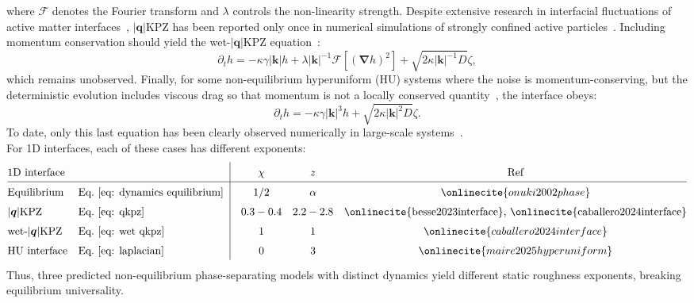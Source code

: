 \documentclass[aps,
reprint,
superscriptaddress,









amsmath,amssymb,floatfix,






prl
]{revtex4-2}
\begin{document}
where $\mathcal F$ denotes the Fourier transform and $\lambda$ controls the non-linearity strength. Despite extensive research in interfacial fluctuations of active matter interfaces~\cite{luu2013capillarylike, yao2025interfacial, Wysocki_2016, langford2024theory, patch2018curvature, lee2017interface, paliwal2017non, del2019interface, chacon2022intrinsic}, $|\bm q|$KPZ has been reported only once in numerical simulations of strongly confined active particles~\cite{krishan2025finite}.
Including momentum conservation should yield the wet-$|\bm q|$KPZ equation~\cite{caballero2024interface}:
\begin{equation}
    \partial_t h = -\kappa\gamma |\bm{k}|h+\lambda|\bm k|^{-1}\mathcal F\left[(\bm \nabla h)^2\right] + \sqrt{2\kappa |\bm{k}|^{-1}D} \zeta,
    \label{eq: wet qkpz}
\end{equation}
which remains unobserved. Finally, for some non-equilibrium hyperuniform (HU) systems where the noise is momentum-conserving, but the deterministic evolution includes viscous drag so that momentum is not a locally conserved quantity~\cite{maire2025hyperuniformity, hexner2017noise, lei2024non}, the interface obeys:
\begin{equation}
    \partial_t h = -\kappa\gamma |\bm{k}|^{3}h+ \sqrt{2\kappa |\bm{k}|^2D} \zeta.
    \label{eq: laplacian}
\end{equation}
To date, only this last equation has been clearly observed numerically in large-scale systems~\cite{maire2025hyperuniform}.\\
For 1D interfaces, each of these cases has different exponents:
\begin{equation*}
\begingroup
\setlength{\arraycolsep}{6pt}
\renewcommand{\arraystretch}{1.5}
\begin{array}{@{}l@{\quad}l|@{\quad}c@{\quad}c@{\quad}c@{}}
\text{1D interface} & & \chi & z & \text{Ref}\\
\hline
\text{Equilibrium} & \text{Eq.}~\eqref{eq: dynamics equilibrium} & 1/2 & \alpha & \onlinecite{onuki2002phase}\\
|\bm q|\text{KPZ} & \text{Eq.}~\eqref{eq: qkpz} & 0.3-0.4 & 2.2-2.8 &
\text{\onlinecite{besse2023interface}, \onlinecite{caballero2024interface}}\\
\text{wet-}|\bm q|\text{KPZ} & \text{Eq.}~\eqref{eq: wet qkpz} & 1 & 1 &
\onlinecite{caballero2024interface}\\
\text{HU interface} & \text{Eq.}~\eqref{eq: laplacian} & 0 & 3 &
\onlinecite{maire2025hyperuniform}\\
\end{array}
\endgroup
\end{equation*}
Thus, three predicted non-equilibrium phase-separating models with distinct dynamics yield different static roughness exponents, breaking equilibrium universality.
\end{document}
